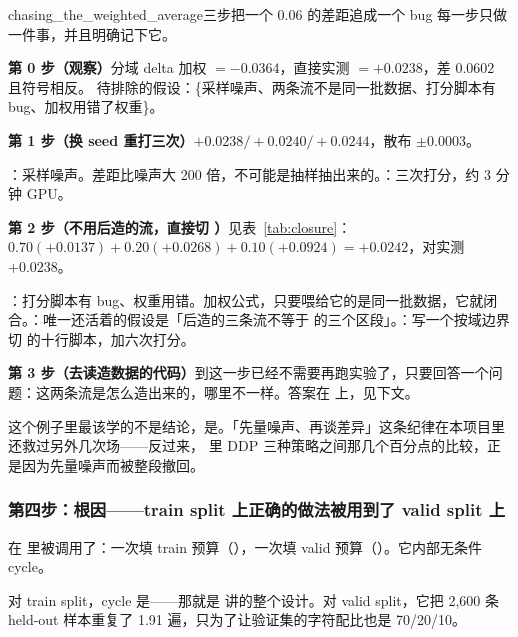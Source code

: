 \begin{examplebox}{chasing_the_weighted_average}{三步把一个 0.06 的差距追成一个 bug}
每一步只做一件事，并且明确记下它。

\medskip\noindent\textbf{第 0 步（观察）}\quad 分域 delta 加权 $=-0.0364$，直接实测 $=+0.0238$，差 $0.0602$ 且符号相反。
待排除的假设：\{采样噪声、两条流不是同一批数据、打分脚本有 bug、加权用错了权重\}。

\medskip\noindent\textbf{第 1 步（换 seed 重打三次）}\quad $+0.0238 / +0.0240 / +0.0244$，散布 $\pm0.0003$。

：采样噪声。差距比噪声大 200 倍，不可能是抽样抽出来的。\quad{}：三次打分，约 3 分钟 GPU。

\medskip\noindent\textbf{第 2 步（不用后造的流，直接切 ）}\quad 见表~\ref{tab:closure}：$0.70(+0.0137)+0.20(+0.0268)+0.10(+0.0924)=+0.0242$，对实测 $+0.0238$。

：打分脚本有 bug、权重用错。加权公式，只要喂给它的是同一批数据，它就闭合。\quad{}：唯一还活着的假设是「后造的三条流不等于  的三个区段」。\quad{}：写一个按域边界切  的十行脚本，加六次打分。

\medskip\noindent\textbf{第 3 步（去读造数据的代码）}\quad 到这一步已经不需要再跑实验了，只要回答一个问题：这两条流是怎么造出来的，哪里不一样。答案在  上，见下文。

\medskip
这个例子里最该学的不是结论，是。「先量噪声、再谈差异」这条纪律在本项目里还救过另外几次场——反过来， 里 DDP 三种策略之间那几个百分点的比较，正是因为先量噪声而被整段撤回。
\end{examplebox}

\subsubsection*{第四步：根因——train split 上正确的做法被用到了 valid split 上}

 在  里被调用了：一次填 train 预算（），一次填 valid 预算（）。它内部无条件 cycle。

对 train split，cycle 是——那就是  讲的整个设计。对 valid split，它把 2{,}600 条 held-out 样本重复了 1.91 遍，只为了让验证集的字符配比也是 70/20/10。

